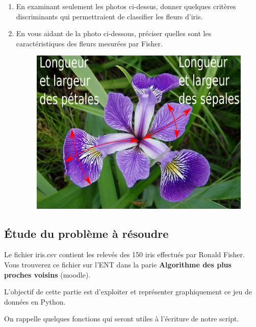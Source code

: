 \documentclass[11pt,a4paper]{article}
\begin{document}
\begin{enumerate}
\item En examinant seulement les photos ci-dessus, donner quelques critères discriminants qui permettraient de classifier les fleurs d'iris.
\vspace{3cm}
\item En vous aidant de la photo ci-dessous, préciser quelles sont les caractéristiques des fleurs mesurées par Fisher.

\begin{figure}[h]
  \centering
  \includegraphics[scale=0.5]{img/Iris_mesure.png}    
\end{figure}
\end{enumerate}

\vspace{2cm}

\newpage
\subsection*{Étude du problème à résoudre}


Le fichier \textsf{iris.csv} contient les relevés des 150 iris effectués par Ronald Fisher. Vous trouverez ce fichier sur l'ENT dans la parie \textbf{Algorithme des plus proches voisins} (moodle).

L'objectif de cette partie est d'exploiter et représenter graphiquement ce jeu de données en Python.

On rappelle quelques fonctions qui seront utiles à l'écriture de notre script.
\end{document}
